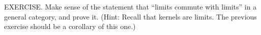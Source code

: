 EXERCISE. Make sense of the statement that “limits commute with limits” in a general category, and prove it. (Hint: Recall that kernels are limits. The previous exercise should be a corollary of this one.)

